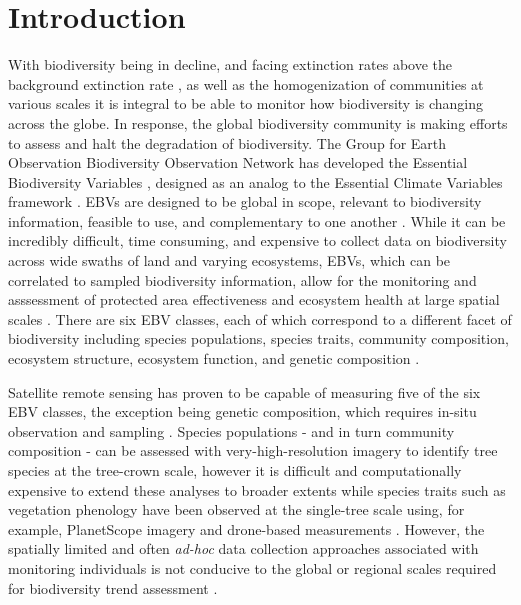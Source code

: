 \documentclass[
  authoryear,
  review,
  3p,
  twocolumn]{elsarticle}
\begin{document}
\hypertarget{introduction}{%
\section{Introduction}\label{introduction}}

With biodiversity being in decline, and facing extinction rates above
the background extinction rate \citep{thomas2004, urban2015}, as well as
the homogenization of communities at various scales \citep{mcgill2015}
it is integral to be able to monitor how biodiversity is changing across
the globe. In response, the global biodiversity community is making
efforts to assess and halt the degradation of biodiversity. The Group
for Earth Observation Biodiversity Observation Network has developed the
Essential Biodiversity Variables \citep[EBVs,][]{pereira2013}, designed
as an analog to the Essential Climate Variables framework
\citep{bojinski2014}. EBVs are designed to be global in scope, relevant
to biodiversity information, feasible to use, and complementary to one
another \citep{skidmore2021}. While it can be incredibly difficult, time
consuming, and expensive to collect data on biodiversity across wide
swaths of land and varying ecosystems, EBVs, which can be correlated to
sampled biodiversity information, allow for the monitoring and
asssessment of protected area effectiveness and ecosystem health at
large spatial scales \citep{hansen2021}. There are six EBV classes, each
of which correspond to a different facet of biodiversity including
species populations, species traits, community composition, ecosystem
structure, ecosystem function, and genetic composition
\citep{pereira2013}.

Satellite remote sensing has proven to be capable of measuring five of
the six EBV classes, the exception being genetic composition, which
requires in-situ observation and sampling \citep{skidmore2021}. Species
populations - and in turn community composition - can be assessed with
very-high-resolution imagery to identify tree species at the tree-crown
scale, however it is difficult and computationally expensive to extend
these analyses to broader extents \citep{fassnacht2016, graves2016}
while species traits such as vegetation phenology have been observed at
the single-tree scale using, for example, PlanetScope imagery and
drone-based measurements \citep{wu2021}. However, the spatially limited
and often \emph{ad-hoc} data collection approaches associated with
monitoring individuals is not conducive to the global or regional scales
required for biodiversity trend assessment \citep{valdez2023}.
\end{document}
